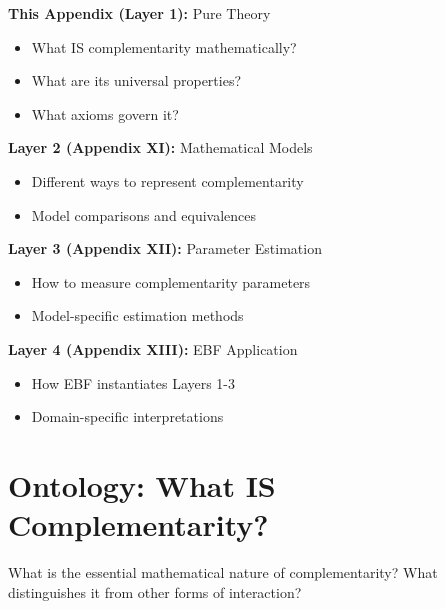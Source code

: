 \begin{tcolorbox}[colback=gray!5!white,colframe=gray!75!black,title=\textbf{Architectural Position}]
\small
\textbf{This Appendix (Layer 1):} Pure Theory
\begin{itemize}[noitemsep]
    \item What IS complementarity mathematically?
    \item What are its universal properties?
    \item What axioms govern it?
\end{itemize}

\textbf{Layer 2 (Appendix XI):} Mathematical Models
\begin{itemize}[noitemsep]
    \item Different ways to represent complementarity
    \item Model comparisons and equivalences
\end{itemize}

\textbf{Layer 3 (Appendix XII):} Parameter Estimation
\begin{itemize}[noitemsep]
    \item How to measure complementarity parameters
    \item Model-specific estimation methods
\end{itemize}

\textbf{Layer 4 (Appendix XIII):} EBF Application
\begin{itemize}[noitemsep]
    \item How EBF instantiates Layers 1-3
    \item Domain-specific interpretations
\end{itemize}
\end{tcolorbox}

\section{Ontology: What IS Complementarity?}
\label{sec:ontology}

\begin{tcolorbox}[colback=red!5!white,colframe=red!75!black,title=\textbf{Fundamental Question}]
What is the essential mathematical nature of complementarity? What distinguishes it from other forms of interaction?
\end{tcolorbox}

